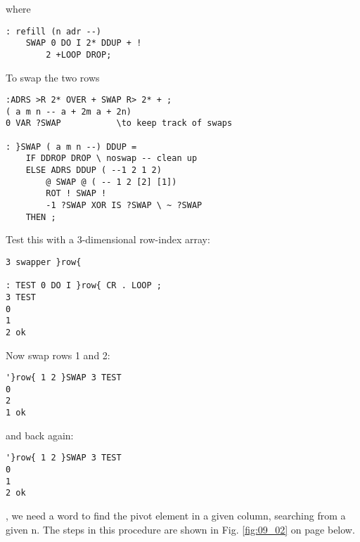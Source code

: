 where

\begin{verbatim}
: refill (n adr --)
    SWAP 0 DO I 2* DDUP + !
        2 +LOOP DROP;
\end{verbatim}

To swap the two rows

\begin{verbatim}
:ADRS >R 2* OVER + SWAP R> 2* + ;
( a m n -- a + 2m a + 2n)
0 VAR ?SWAP           \to keep track of swaps

: }SWAP ( a m n --) DDUP =
    IF DDROP DROP \ noswap -- clean up
    ELSE ADRS DDUP ( --1 2 1 2)
        @ SWAP @ ( -- 1 2 [2] [1])
        ROT ! SWAP !  
        -1 ?SWAP XOR IS ?SWAP \ ~ ?SWAP
    THEN ;
\end{verbatim}

Test this with a 3-dimensional row-index array:

\begin{verbatim}
3 swapper }row{

: TEST 0 DO I }row{ CR . LOOP ;
3 TEST
0
1
2 ok
\end{verbatim}

Now swap rows 1 and 2:

\begin{verbatim}
'}row{ 1 2 }SWAP 3 TEST
0
2
1 ok
\end{verbatim}
and back again:
\begin{verbatim}
'}row{ 1 2 }SWAP 3 TEST
0
1
2 ok
\end{verbatim} 

, we need a word to find the pivot element in a given
column, searching from a given n. The steps in this procedure
are shown in Fig. \ref{fig:09_02} on page \pageref{fig:09_02} below.


